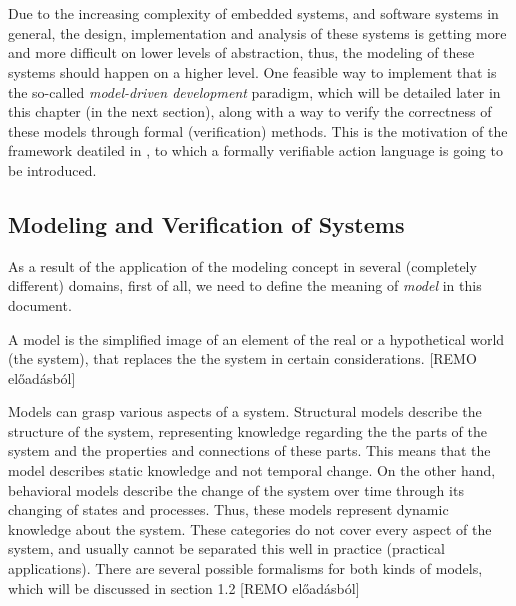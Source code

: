\chapter{\bevezetes}

Due to the increasing complexity of embedded systems, and software systems in general, the design, implementation and analysis of these systems is getting more and more difficult on lower levels of abstraction, thus, the modeling of these systems should happen on a higher level. One feasible way to implement that is the so-called \textit{model-driven development} paradigm, which will be detailed later in this chapter (in the next section), along with a way to verify the correctness of these models through formal (verification) methods. This is the motivation of the framework deatiled in \cite{GammaVince2018}, to which a formally verifiable action language is going to be introduced.
\section{Modeling and Verification of Systems} \label{mdsdForm_section}
As a result of the application of the modeling concept in several (completely different) domains, first of all, we need to define the meaning of \textit{model} in this document.
\begin{definition}[Model]
	A model is the simplified image of an element of the real or a hypothetical world (the system), that replaces the the system in certain considerations. [REMO előadásból]
\end{definition}
Models can grasp various aspects of a system. Structural models describe the structure of the system, representing knowledge regarding the the parts of the system and the properties and connections of these parts. This means that the model describes static knowledge and not temporal change. On the other hand, behavioral models describe the change of the system over time through its changing of states and processes. Thus, these models represent dynamic knowledge about the system. These categories do not cover every aspect of the system, and usually cannot be separated this well in practice (practical applications). There are several possible formalisms for both kinds of models, which will be discussed in section 1.2 [REMO előadásból]

